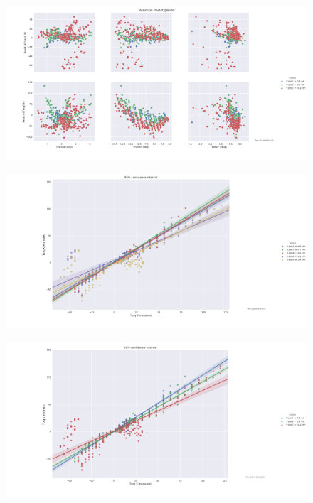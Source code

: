 \documentclass[preprint,12pt,3p]{elsarticle}
\begin{document}
\begin{figure}[H]
\centering
\includegraphics[width=.9\textwidth]{images/round1/LinearResid_thetaY.png}
\end{figure}

\begin{figure}[H]
\centering
\includegraphics[width=.9\textwidth]{images/round1/TorqX_hueX.png}
\end{figure}

\begin{figure}[H]
\centering
\includegraphics[width=.9\textwidth]{images/round1/TorqX_hueY.png}
\end{figure}
\end{document}
